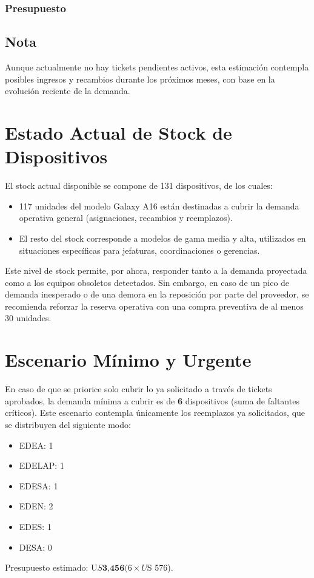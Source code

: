 \documentclass[a4paper,12pt]{article}
\begin{document}
\subsubsection{Presupuesto}

\subsection{Nota}
Aunque actualmente no hay tickets pendientes activos, esta estimación contempla posibles ingresos y recambios durante los próximos meses, con base en la evolución reciente de la demanda.

\section{Estado Actual de Stock de Dispositivos}
El stock actual disponible se compone de 131 dispositivos, de los cuales:
\begin{itemize}
    \item 117 unidades del modelo Galaxy A16 están destinadas a cubrir la demanda operativa general (asignaciones, recambios y reemplazos).
    \item El resto del stock corresponde a modelos de gama media y alta, utilizados en situaciones específicas para jefaturas, coordinaciones o gerencias.
\end{itemize}
Este nivel de stock permite, por ahora, responder tanto a la demanda proyectada como a los equipos obsoletos detectados. Sin embargo, en caso de un pico de demanda inesperado o de una demora en la reposición por parte del proveedor, se recomienda reforzar la reserva operativa con una compra preventiva de al menos 30 unidades.

\section{Escenario Mínimo y Urgente}
En caso de que se priorice solo cubrir lo ya solicitado a través de tickets aprobados, la demanda mínima a cubrir es de \textbf{6} dispositivos (suma de faltantes críticos).
Este escenario contempla únicamente los reemplazos ya solicitados, que se distribuyen del siguiente modo:
\begin{itemize}
    \item EDEA: 1
    \item EDELAP: 1
    \item EDESA: 1
    \item EDEN: 2
    \item EDES: 1
    \item DESA: 0
\end{itemize}
Presupuesto estimado: U$S \textbf{3,456} (6 × U$S 576).
\end{document}
